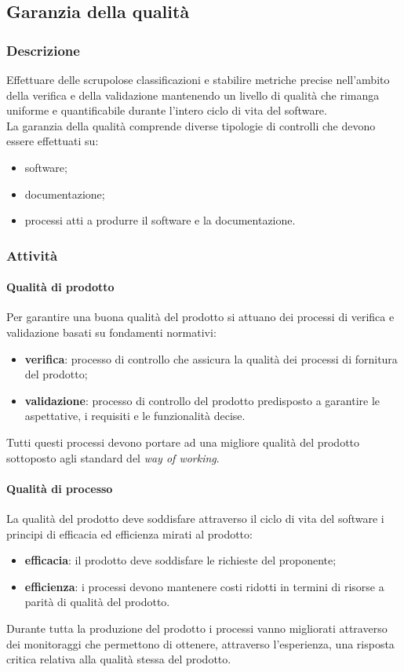 \subsection{Garanzia della qualità}
					
	\subsubsection{Descrizione}
	Effettuare delle scrupolose classificazioni e stabilire metriche precise nell'ambito della verifica e della validazione mantenendo un livello di qualità che rimanga uniforme e quantificabile durante l'intero ciclo di vita del software.
	\\
	La garanzia della qualità comprende diverse tipologie di controlli che devono essere effettuati su:
	\begin{itemize}
		\item software;
		\item documentazione;
		\item processi atti a produrre il software e la documentazione.						
	\end{itemize}	
				
	\subsubsection{Attività}
		\paragraph{Qualità di prodotto}	
		Per garantire una buona qualità del prodotto si attuano dei processi di verifica e validazione basati su fondamenti normativi:
		\begin{itemize}
			\item \textbf{verifica}: processo di controllo che assicura la qualità dei processi di fornitura del prodotto;
			\item \textbf{validazione}: processo di controllo del prodotto predisposto a garantire le aspettative, i requisiti e le funzionalità decise.
		\end{itemize}
		Tutti questi processi devono portare ad una migliore qualità del prodotto sottoposto agli standard del \textit{way of working}.
					
		\paragraph{Qualità di processo}
		La qualità del prodotto deve soddisfare attraverso il ciclo di vita del software i principi di efficacia ed efficienza mirati al prodotto:
		\begin{itemize}
			\item \textbf{efficacia}: il prodotto deve soddisfare le richieste del proponente;
			\item \textbf{efficienza}: i processi devono mantenere costi ridotti in termini di risorse a parità di qualità del prodotto.
		\end{itemize}
		Durante tutta la produzione del prodotto i processi vanno migliorati attraverso dei monitoraggi che permettono di ottenere, attraverso l'esperienza, una risposta critica relativa alla qualità stessa del prodotto.
		
